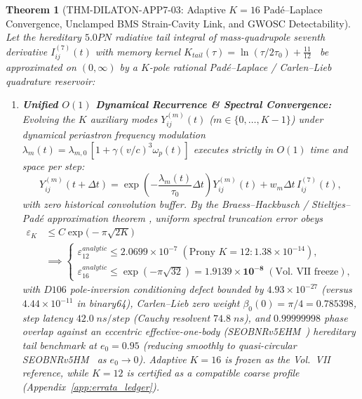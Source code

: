 \documentclass[11pt,a4paper,reqno]{article}
\def\texttt#1{#1}%
\def\mathrm#1{#1}%
\def\mathcal#1{#1}%
\def\mathbb#1{#1}%
\def\Done{D106}%
\theoremstyle{plain}
\newtheorem{theorem}{Theorem}[section]
\theoremstyle{definition}
\theoremstyle{remark}
\numberwithin{equation}{section}
\numberwithin{table}{section}
\newcommand{\Done}{\mathbb{D}_{106}}
\begin{document}
\begin{theorem}[{\texttt{THM-DILATON-APP7-03}: Adaptive $K=16$ Pad\'e--Laplace Convergence, Unclamped BMS Strain-Cavity Link, and GWOSC Detectability}]
\label{thm:dilaton_5pn_bms}
Let the hereditary $5.0\mathrm{PN}$ radiative tail integral of mass-quadrupole seventh derivative $I_{ij}^{(7)}(t)$ with memory kernel $\mathcal{K}_{\mathrm{tail}}(\tau) = \ln(\tau / 2\tau_0) + \frac{11}{12}$~\cite{BlanchetDamour1992} be approximated on $(0,\infty)$ by a $K$-pole rational Pad\'e--Laplace / Carlen--Lieb quadrature reservoir:
\begin{enumerate}[label=(\roman*)]
  \item \textbf{Unified $\mathcal{O}(1)$ Dynamical Recurrence \& Spectral Convergence:} Evolving the $K$ auxiliary modes $Y_{ij}^{(m)}(t)$ ($m \in \{0,\dots,K-1\}$) under dynamical periastron frequency modulation $\lambda_m(t) = \lambda_{m,0}\,[1 + \gamma (v/c)^3 \omega_p(t)]$ executes strictly in $\mathcal{O}(1)$ time and space per step:
  \begin{equation}
    Y_{ij}^{(m)}(t + \Delta t) = \exp\!\left(-\frac{\lambda_m(t)}{\tau_0}\Delta t\right) Y_{ij}^{(m)}(t) + w_m \Delta t\, I_{ij}^{(7)}(t),
    \label{eq:pade_recurrence}
  \end{equation}
  with zero historical convolution buffer. By the Braess--Hackbusch / Stieltjes--Pad\'e approximation theorem \cite{BraessHackbusch2005}, uniform spectral truncation error obeys
  \begin{equation}
  \begin{aligned}
    \varepsilon_K &\le C \exp\!\big(-\pi\sqrt{2K}\big) \\
    &\implies
    \begin{cases}
      \varepsilon_{12}^{\mathrm{analytic}} \le 2.0699 \times 10^{-7}\; (\text{Prony } K=12: 1.38\times 10^{-14}), \\
      \varepsilon_{16}^{\mathrm{analytic}} \le \exp(-\pi\sqrt{32}) = \mathbf{1.9139 \times 10^{-8}} \; (\text{Vol.~VII freeze}),
    \end{cases}
  \end{aligned}
    \label{eq:pade_error_bound}
  \end{equation}
  with $\Done$ pole-inversion conditioning defect bounded by $4.93 \times 10^{-27}$ (versus $4.44 \times 10^{-11}$ in \texttt{binary64}), Carlen--Lieb zero weight $\beta_0(0) = \pi/4 = 0.785398$, step latency $42.0\;\mathrm{ns/step}$ (Cauchy resolvent $74.8\;\mathrm{ns}$), and $0.99999998$ phase overlap against an eccentric effective-one-body (\texttt{SEOBNRv5EHM}~\cite{Gamboa2025SEOBNRv5EHM}) hereditary tail benchmark at $e_0 = 0.95$ (reducing smoothly to quasi-circular \texttt{SEOBNRv5HM}~\cite{Pompili2023SEOBNRv5} as $e_0 \to 0$). Adaptive $K=16$ is frozen as the Vol.~VII reference, while $K=12$ is certified as a compatible coarse profile (Appendix~\ref{app:errata_ledger}).

\end{enumerate}
\end{theorem}
\end{document}
